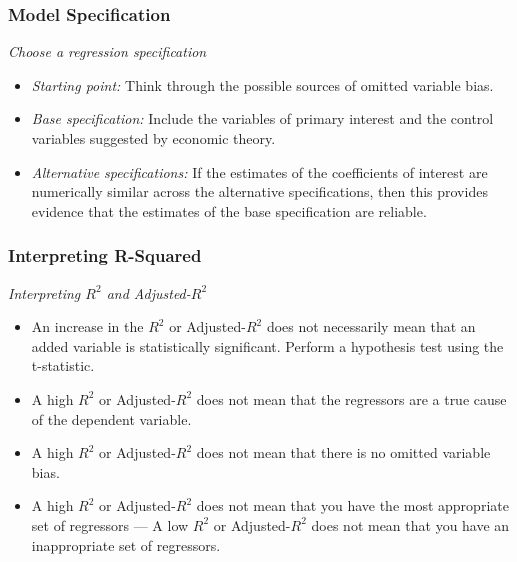

\begin{frame}
\frametitle{Model Specification}
\emph{Choose a regression specification}
\begin{itemize}
\item \emph{Starting point:} 
\newlinequad
Think through the possible sources of omitted variable bias. 
\item \emph{Base specification:} 
\newlinequad
Include the variables of primary interest and the control variables suggested by economic theory.
\item \emph{Alternative specifications:} 
\newlinequad
If the estimates of the coefficients of interest are numerically similar across the alternative specifications, then this provides evidence that the estimates of the base specification are reliable. 
\end{itemize}
\end{frame}


\begin{frame}
\frametitle{Interpreting R-Squared}
\emph{Interpreting $R^2$ and Adjusted-$R^2$}
\begin{itemize}
\item An increase in the $R^2$ or Adjusted-$R^2$ does not necessarily mean that an added variable is statistically significant. Perform a hypothesis test using the t-statistic.
\item A high $R^2$ or Adjusted-$R^2$ does not mean that the regressors are a true cause of the dependent variable.
\item A high $R^2$ or Adjusted-$R^2$ does not mean that there is no omitted variable bias.
\item A high $R^2$ or Adjusted-$R^2$ does not mean that you have the most appropriate set of regressors
--- A low $R^2$ or Adjusted-$R^2$ does not mean that you have an inappropriate set of regressors. 
\end{itemize}
\end{frame}
